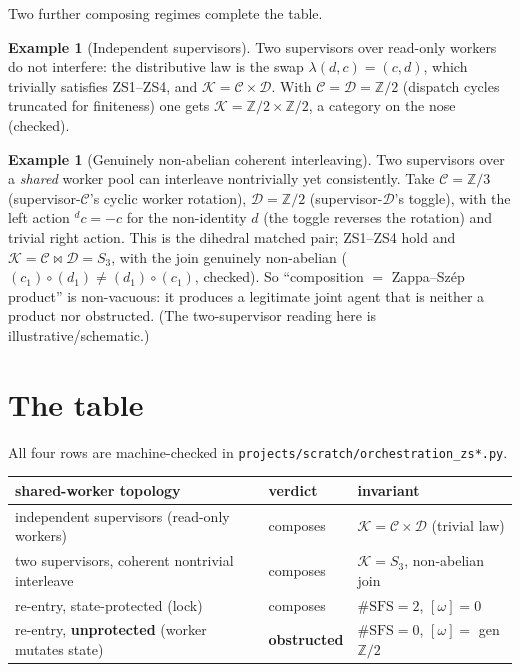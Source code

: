 \documentclass[11pt]{article}
\theoremstyle{definition}
\newtheorem{example}[theorem]{Example}
\newcommand{\C}{\mathcal{C}}
\newcommand{\D}{\mathcal{D}}
\newcommand{\K}{\mathcal{K}}
\begin{document}
Two further composing regimes complete the table.

\begin{example}[Independent supervisors]\label{ex:indep}
Two supervisors over read-only workers do not interfere: the distributive law is the
swap $\lambda(d,c)=(c,d)$, which trivially satisfies ZS1--ZS4, and
$\K=\C\times\D$. With $\C=\D=\mathbb Z/2$ (dispatch cycles truncated for finiteness)
one gets $\K=\mathbb Z/2\times\mathbb Z/2$, a category on the nose (checked).
\end{example}

\begin{example}[Genuinely non-abelian coherent interleaving]\label{ex:s3}
Two supervisors over a \emph{shared} worker pool can interleave nontrivially yet
consistently. Take $\C=\mathbb Z/3$ (supervisor-$\C$'s cyclic worker rotation),
$\D=\mathbb Z/2$ (supervisor-$\D$'s toggle), with the left action ${}^{d}c=-c$ for
the non-identity $d$ (the toggle reverses the rotation) and trivial right action.
This is the dihedral matched pair; ZS1--ZS4 hold and
$\K=\C\bowtie\D=S_3$, with the join genuinely non-abelian
($(c_1)\circ(d_1)\neq(d_1)\circ(c_1)$, checked). So ``composition $=$ Zappa--Sz\'ep
product'' is non-vacuous: it produces a legitimate joint agent that is neither a
product nor obstructed. (The two-supervisor reading here is illustrative/schematic.)
\end{example}

\section{The table}\label{sec:table}

All four rows are machine-checked in \texttt{projects/scratch/orchestration\_zs*.py}.

\begin{center}
\begin{tabular}{@{}lll@{}}
\toprule
shared-worker topology & verdict & invariant \\
\midrule
independent supervisors (read-only workers) & composes & $\K=\C\times\D$ (trivial law) \\
two supervisors, coherent nontrivial interleave & composes & $\K=S_3$, non-abelian join \\
re-entry, state-protected (lock) & composes & $\#\mathrm{SFS}=2$, $[\omega]=0$ \\
re-entry, \textbf{unprotected} (worker mutates state) & \textbf{obstructed} & $\#\mathrm{SFS}=0$, $[\omega]=$ gen $\mathbb Z/2$ \\
\bottomrule
\end{tabular}
\end{center}
\end{document}
